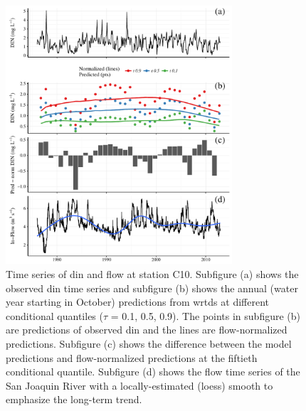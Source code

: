 \documentclass[letterpaper,12pt,oneside]{article}\usepackage[]{graphicx}\usepackage[]{color}
\begin{document}
\begin{figure}[!ht]

{\centering \includegraphics[width=0.75\textwidth]{figs/dinc10-1} 

}

\caption{Time series of \ac{din} and flow at station C10.  Subfigure (a) shows the observed \ac{din} time series and subfigure (b) shows the annual (water year starting in October) predictions from \ac{wrtds} at different conditional quantiles ($\tau$ = 0.1, 0.5, 0.9).  The points in subfigure (b) are predictions of observed \ac{din} and the lines are flow-normalized predictions.  Subfigure (c) shows the difference between the model predictions and flow-normalized predictions at the fiftieth conditional quantile.  Subfigure (d) shows the flow time series of the San Joaquin River with a locally-estimated (loess) smooth to emphasize the long-term trend.}\label{fig:dinc10}
\end{figure}
\end{document}

